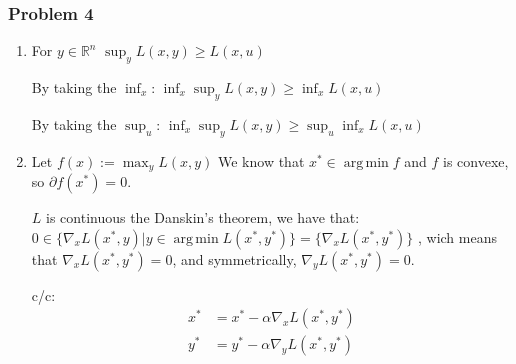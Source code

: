 \documentclass[12pt]{article}
\newcommand{\Q}[1]{\subsubsection*{Problem #1}}
\DeclareMathOperator*{\argmin}{arg\,min}
\begin{document}
 
\Q{4}
\begin{enumerate}
\item
  For $y \in \mathbb R^n$
  $\sup_y L(x, y) \ge L(x, u)$

  By taking the $\inf_x$:
  $\inf_x \sup_y L(x, y) \ge \inf_x L(x, u)$

  By taking the $\sup_u$:
  $\inf_x \sup_y L(x, y) \ge \sup_u \inf_x L(x, u)$

\item

  Let $f(x) := \max_y L(x, y)$
  We know that $x^* \in \argmin f$ and $f$ is convexe,
  so $\partial f(x^*) = 0$.

  $L$ is continuous the Danskin's theorem, we have that:
  $0 \in \{ \nabla_x L (x^*, y) | y \in \argmin L(x^*, y^*) \} = \{ \nabla_x L (x^*, y^*) \}$ , wich means that
  $\nabla_x L (x^*, y^*) = 0$, and symmetrically, $\nabla_y L (x^*, y^*) = 0$.

  c/c:
  \begin{align*}
    x^* &= x^* - \alpha \nabla_x L (x^*, y^*)\\
    y^* &= y^* - \alpha \nabla_y L (x^*, y^*)
  \end{align*}
  
\end{enumerate}
\end{document}
